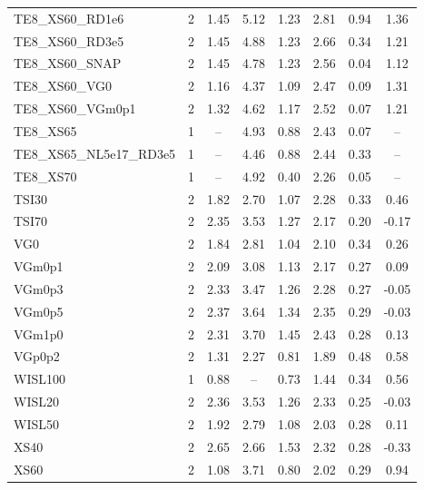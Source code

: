 \begin{tabular}{@{}l@{\,}c@{\,}c@{\,}c@{\,}c@{\,}c@{\,}c@{\,}c@{}}
TE8\_XS60\_RD1e6 & 2 & 1.45 & 5.12 & 1.23 & 2.81 & 0.94 & 1.36 \\
TE8\_XS60\_RD3e5 & 2 & 1.45 & 4.88 & 1.23 & 2.66 & 0.34 & 1.21 \\
TE8\_XS60\_SNAP & 2 & 1.45 & 4.78 & 1.23 & 2.56 & 0.04 & 1.12 \\
TE8\_XS60\_VG0 & 2 & 1.16 & 4.37 & 1.09 & 2.47 & 0.09 & 1.31 \\
TE8\_XS60\_VGm0p1 & 2 & 1.32 & 4.62 & 1.17 & 2.52 & 0.07 & 1.21 \\
TE8\_XS65 & 1 & -- & 4.93 & 0.88 & 2.43 & 0.07 & -- \\
TE8\_XS65\_NL5e17\_RD3e5 & 1 & -- & 4.46 & 0.88 & 2.44 & 0.33 & -- \\
TE8\_XS70 & 1 & -- & 4.92 & 0.40 & 2.26 & 0.05 & -- \\
TSI30 & 2 & 1.82 & 2.70 & 1.07 & 2.28 & 0.33 & 0.46 \\
TSI70 & 2 & 2.35 & 3.53 & 1.27 & 2.17 & 0.20 & -0.17 \\
VG0 & 2 & 1.84 & 2.81 & 1.04 & 2.10 & 0.34 & 0.26 \\
VGm0p1 & 2 & 2.09 & 3.08 & 1.13 & 2.17 & 0.27 & 0.09 \\
VGm0p3 & 2 & 2.33 & 3.47 & 1.26 & 2.28 & 0.27 & -0.05 \\
VGm0p5 & 2 & 2.37 & 3.64 & 1.34 & 2.35 & 0.29 & -0.03 \\
VGm1p0 & 2 & 2.31 & 3.70 & 1.45 & 2.43 & 0.28 & 0.13 \\
VGp0p2 & 2 & 1.31 & 2.27 & 0.81 & 1.89 & 0.48 & 0.58 \\
WISL100 & 1 & 0.88 & -- & 0.73 & 1.44 & 0.34 & 0.56 \\
WISL20 & 2 & 2.36 & 3.53 & 1.26 & 2.33 & 0.25 & -0.03 \\
WISL50 & 2 & 1.92 & 2.79 & 1.08 & 2.03 & 0.28 & 0.11 \\
XS40 & 2 & 2.65 & 2.66 & 1.53 & 2.32 & 0.28 & -0.33 \\
XS60 & 2 & 1.08 & 3.71 & 0.80 & 2.02 & 0.29 & 0.94 \\
\bottomrule\end{tabular}
